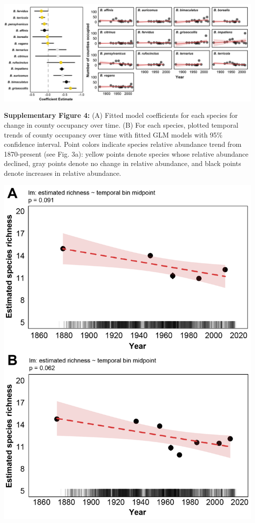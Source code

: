 \documentclass[11pt,]{article}
\begin{document}
\clearpage

\newpage

\includegraphics[width=1\textwidth,height=\textheight]{../ms_figs/fig6.png}

\textbf{Supplementary Figure 4:} (A) Fitted model coefficients for each
species for change in county occupancy over time. (B) For each species,
plotted temporal trends of county occupancy over time with fitted GLM
models with 95\% confidence interval. Point colors indicate species
relative abundance trend from 1870-present (see Fig. 3a): yellow points
denote species whose relative abundance declined, gray points denote no
change in relative abundance, and black points denote increases in
relative abundance.

\clearpage

\newpage

\includegraphics[width=1\textwidth,height=\textheight]{../ms_figs/fig_s4.png}
\end{document}
